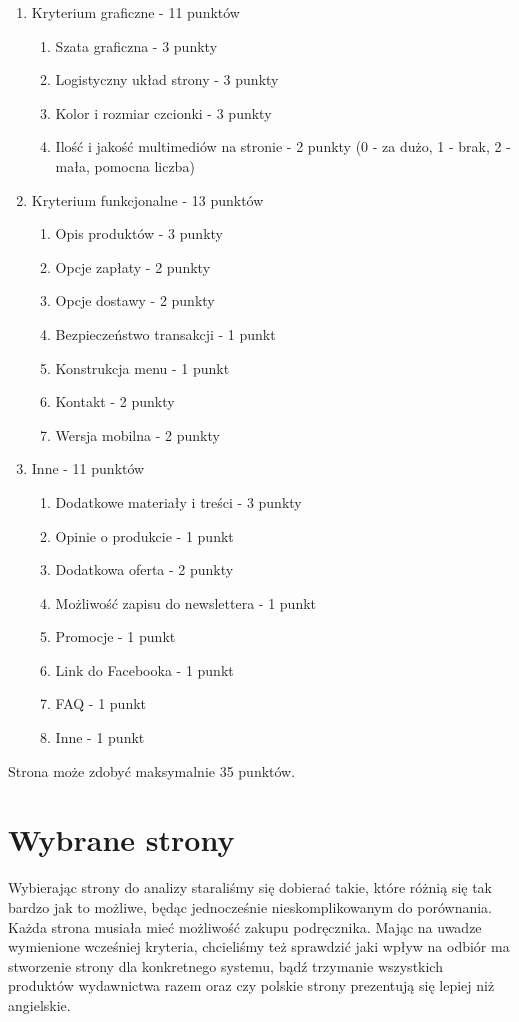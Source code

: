 \documentclass[a4paper,11pt]{article}
\begin{document}
\begin{enumerate}
	\item Kryterium graficzne - 11 punktów
	\begin{enumerate}
		\item Szata graficzna - 3 punkty
		\item Logistyczny układ strony - 3 punkty 
		\item Kolor i rozmiar czcionki - 3 punkty
		\item Ilość i jakość multimediów na stronie - 2 punkty (0 - za dużo, 1 - brak, 2 - mała, pomocna liczba)
	\end{enumerate} 
	\item Kryterium funkcjonalne - 13 punktów
	\begin{enumerate}
		\item Opis produktów - 3 punkty
		\item Opcje zapłaty - 2 punkty
		\item Opcje dostawy - 2 punkty
		\item Bezpieczeństwo transakcji - 1 punkt
		\item Konstrukcja menu - 1 punkt
		\item Kontakt - 2 punkty
		\item Wersja mobilna - 2 punkty
	\end{enumerate} 
	\item Inne - 11 punktów
	\begin{enumerate}
		\item Dodatkowe materiały i treści - 3 punkty
		\item Opinie o produkcie - 1 punkt
		\item Dodatkowa oferta - 2 punkty
		\item Możliwość zapisu do newslettera - 1 punkt
		\item Promocje - 1 punkt
		\item Link do Facebooka - 1 punkt
		\item FAQ - 1 punkt
		\item Inne - 1 punkt
	\end{enumerate} 
\end{enumerate} 

Strona może zdobyć maksymalnie 35 punktów.

\section {Wybrane strony}

Wybierając strony do analizy staraliśmy się dobierać takie, które różnią się tak bardzo jak to możliwe, będąc jednocześnie nieskomplikowanym do porównania. Każda strona musiała mieć możliwość zakupu podręcznika. Mając na uwadze wymienione wcześniej kryteria, chcieliśmy też sprawdzić jaki wpływ na odbiór ma stworzenie strony dla konkretnego systemu, bądź trzymanie wszystkich produktów wydawnictwa razem oraz czy polskie strony prezentują się lepiej niż angielskie. \\
\end{document}
